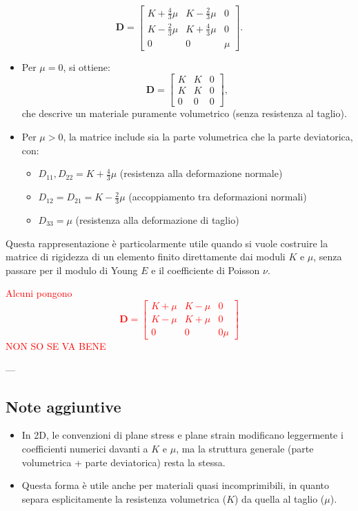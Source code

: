 \documentclass{article}
\begin{document}
\[
\mathbf{D} =
\begin{bmatrix}
K + \frac{4}{3}\mu & K - \frac{2}{3}\mu & 0 \\
K - \frac{2}{3}\mu & K + \frac{4}{3}\mu & 0 \\
0 & 0 & \mu
\end{bmatrix}.
\]

\begin{itemize}
    \item Per $\mu = 0$, si ottiene:
    \[
    \mathbf{D} =
    \begin{bmatrix}
    K & K & 0 \\
    K & K & 0 \\
    0 & 0 & 0
    \end{bmatrix},
    \]
    che descrive un materiale puramente volumetrico (senza resistenza al taglio).
    \item Per $\mu > 0$, la matrice include sia la parte volumetrica che la parte deviatorica, con:
    \begin{itemize}
        \item $D_{11}, D_{22} = K + \frac{4}{3}\mu$ (resistenza alla deformazione normale)
        \item $D_{12} = D_{21} = K - \frac{2}{3}\mu$ (accoppiamento tra deformazioni normali)
        \item $D_{33} = \mu$ (resistenza alla deformazione di taglio)
    \end{itemize}
\end{itemize}

Questa rappresentazione è particolarmente utile quando si vuole costruire la matrice di rigidezza di un elemento finito direttamente dai moduli $K$ e $\mu$, senza passare per il modulo di Young $E$ e il coefficiente di Poisson $\nu$.

\textcolor{red}{Alcuni pongono
$$ \mathbf{D} = \begin{bmatrix} K+\mu & K-\mu & 0 \\ K-\mu & K+\mu & 0 \\ 0 & 0 & 0\mu \end{bmatrix} $$
NON SO SE VA BENE
}

---

\subsection*{Note aggiuntive}

\begin{itemize}
    \item In 2D, le convenzioni di plane stress e plane strain modificano leggermente i coefficienti numerici davanti a $K$ e $\mu$, ma la struttura generale (parte volumetrica + parte deviatorica) resta la stessa.
    \item Questa forma è utile anche per materiali quasi incomprimibili, in quanto separa esplicitamente la resistenza volumetrica ($K$) da quella al taglio ($\mu$).
\end{itemize}
\end{document}
